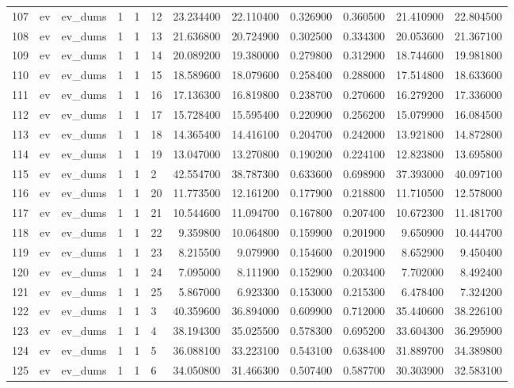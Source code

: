 \begin{tabular}{llllllrrrrrr}
107 & ev & ev_dums & 1 & 1 & 12 & 23.234400 & 22.110400 & 0.326900 & 0.360500 & 21.410900 & 22.804500 \\
108 & ev & ev_dums & 1 & 1 & 13 & 21.636800 & 20.724900 & 0.302500 & 0.334300 & 20.053600 & 21.367100 \\
109 & ev & ev_dums & 1 & 1 & 14 & 20.089200 & 19.380000 & 0.279800 & 0.312900 & 18.744600 & 19.981800 \\
110 & ev & ev_dums & 1 & 1 & 15 & 18.589600 & 18.079600 & 0.258400 & 0.288000 & 17.514800 & 18.633600 \\
111 & ev & ev_dums & 1 & 1 & 16 & 17.136300 & 16.819800 & 0.238700 & 0.270600 & 16.279200 & 17.336000 \\
112 & ev & ev_dums & 1 & 1 & 17 & 15.728400 & 15.595400 & 0.220900 & 0.256200 & 15.079900 & 16.084500 \\
113 & ev & ev_dums & 1 & 1 & 18 & 14.365400 & 14.416100 & 0.204700 & 0.242000 & 13.921800 & 14.872800 \\
114 & ev & ev_dums & 1 & 1 & 19 & 13.047000 & 13.270800 & 0.190200 & 0.224100 & 12.823800 & 13.695800 \\
115 & ev & ev_dums & 1 & 1 & 2 & 42.554700 & 38.787300 & 0.633600 & 0.698900 & 37.393000 & 40.097100 \\
116 & ev & ev_dums & 1 & 1 & 20 & 11.773500 & 12.161200 & 0.177900 & 0.218800 & 11.710500 & 12.578000 \\
117 & ev & ev_dums & 1 & 1 & 21 & 10.544600 & 11.094700 & 0.167800 & 0.207400 & 10.672300 & 11.481700 \\
118 & ev & ev_dums & 1 & 1 & 22 & 9.359800 & 10.064800 & 0.159900 & 0.201900 & 9.650900 & 10.444700 \\
119 & ev & ev_dums & 1 & 1 & 23 & 8.215500 & 9.079900 & 0.154600 & 0.201900 & 8.652900 & 9.450400 \\
120 & ev & ev_dums & 1 & 1 & 24 & 7.095000 & 8.111900 & 0.152900 & 0.203400 & 7.702000 & 8.492400 \\
121 & ev & ev_dums & 1 & 1 & 25 & 5.867000 & 6.923300 & 0.153000 & 0.215300 & 6.478400 & 7.324200 \\
122 & ev & ev_dums & 1 & 1 & 3 & 40.359600 & 36.894000 & 0.609900 & 0.712000 & 35.440600 & 38.226100 \\
123 & ev & ev_dums & 1 & 1 & 4 & 38.194300 & 35.025500 & 0.578300 & 0.695200 & 33.604300 & 36.295900 \\
124 & ev & ev_dums & 1 & 1 & 5 & 36.088100 & 33.223100 & 0.543100 & 0.638400 & 31.889700 & 34.389800 \\
125 & ev & ev_dums & 1 & 1 & 6 & 34.050800 & 31.466300 & 0.507400 & 0.587700 & 30.303900 & 32.583100 \\

\end{tabular}
